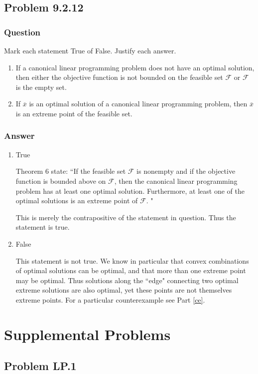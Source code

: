 \documentclass[12pt]{article}
\begin{document}
\subsection{Problem 9.2.12}
\subsubsection{Question}
Mark each statement True of False. Justify each answer.
\begin{enumerate}
\item If a canonical linear programming problem does not have an optimal solution, then either the objective function is not bounded on the feasible set $\mathcal{F}$ or $\mathcal{F}$ is the empty set.
\item If $\overline{x}$ is an optimal solution of a canonical linear programming problem, then $\overline{x}$ is an extreme point of the feasible set.
\end{enumerate}
\subsubsection{Answer}
\begin{enumerate}
\item  True

Theorem 6 state: ``If the feasible set $\mathcal{F}$ is nonempty and if the objective function is bounded above on $\mathcal{F}$, then the canonical linear programming problem has at least one optimal solution. Furthermore, at least one of the optimal solutions is an extreme point of $\mathcal{F}$. "

This is merely the contrapositive of the statement in question. Thus the statement is true.
\item False

This statement is not true. We know in particular that convex combinations of optimal solutions can be optimal, and that more than one extreme point may be optimal. Thus solutions along the ``edge" connecting two optimal extreme solutions are also optimal, yet these points are not themselves extreme points. For a particular counterexample see Part \ref{ce}.
\end{enumerate}


\section{Supplemental Problems}

\subsection{Problem LP.1}
\end{document}
